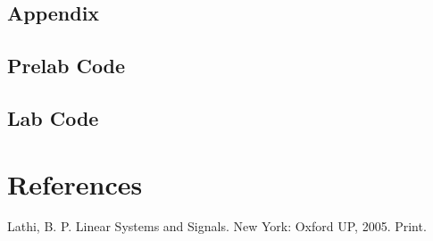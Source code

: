 \documentclass{article}
\begin{document}
\subsection{Appendix}
\subsection{Prelab Code}

\subsection{Lab Code}

\section{References}

Lathi, B. P. Linear Systems and Signals. New York: Oxford UP, 2005. Print.
\end{document}
